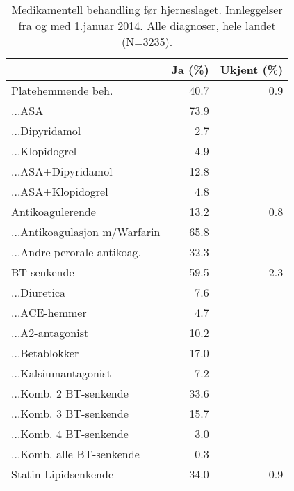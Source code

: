 \documentclass [norsk,a4paper,twoside]{article}\usepackage[]{graphicx}\usepackage[]{color}
\begin{document}
\begin{table}[ht]
\centering
\begin{tabular}{lrr}
  \hline
 & Ja (\%) & Ukjent (\%) \\ 
  \hline
Platehemmende beh. & 40.7 & 0.9 \\ 
  ...ASA & 73.9 &  \\ 
  ...Dipyridamol & 2.7 &  \\ 
  ...Klopidogrel & 4.9 &  \\ 
  ...ASA+Dipyridamol & 12.8 &  \\ 
  ...ASA+Klopidogrel & 4.8 &  \\ 
  Antikoagulerende & 13.2 & 0.8 \\ 
  ...Antikoagulasjon m/Warfarin & 65.8 &  \\ 
  ...Andre perorale antikoag. & 32.3 &  \\ 
  BT-senkende & 59.5 & 2.3 \\ 
  ...Diuretica & 7.6 &  \\ 
  ...ACE-hemmer & 4.7 &  \\ 
  ...A2-antagonist & 10.2 &  \\ 
  ...Betablokker & 17.0 &  \\ 
  ...Kalsiumantagonist & 7.2 &  \\ 
  ...Komb. 2 BT-senkende & 33.6 &  \\ 
  ...Komb. 3 BT-senkende & 15.7 &  \\ 
  ...Komb. 4 BT-senkende & 3.0 &  \\ 
  ...Komb. alle BT-senkende & 0.3 &  \\ 
  Statin-Lipidsenkende & 34.0 & 0.9 \\ 
   \hline
\end{tabular}
\caption{Medikamentell behandling før hjerneslaget. Innleggelser fra og med 1.januar 2014. 
		Alle diagnoser, hele landet (N=3235).} 
\label{tab:MedBehPre2}
\end{table}
\end{document}
